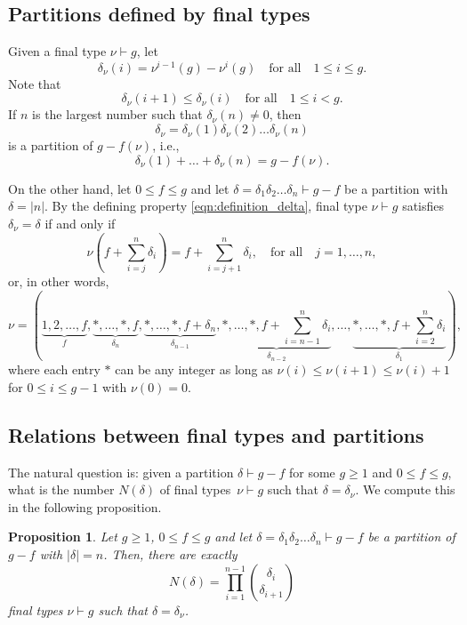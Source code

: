 \documentclass[11pt]{amsart}
\numberwithin{equation}{section}
\theoremstyle{plain}
\newcommand{\<}{\left \langle}
\renewcommand{\>}{\right \rangle}
\newtheorem{prop}[thm]{Proposition}
\theoremstyle{definition}
\theoremstyle{remark}
\begin{document}
\subsection{Partitions defined by final types}
\label{subsec:partitions_coming_from_final_types}
Given a final type $\nu \vdash g$, let 
\begin{equation}
\delta_{\nu}(i) = \nu^{i - 1}(g) - \nu^{i}(g)\quad \text{for all} \quad 1 \leq i \leq g.
\label{eqn:definition_delta}
\end{equation}
Note that $$\delta_{\nu}(i +1) \leq \delta_{\nu}(i)\quad \text{for all}\quad 1 \leq i < g.$$ If $n$ is the largest number such that $\delta_{\nu}(n) \neq 0$, then $$\delta_{\nu} = \delta_{\nu}(1)\delta_{\nu}(2) \ldots \delta_{\nu}(n)$$
is a partition of $g - f(\nu)$, i.e., $$\delta_{\nu}(1) + \ldots +  \delta_{\nu}(n) = g - f(\nu).$$ 

On the other hand, let $0 \leq f \leq g$ and let $\delta = \delta_1\delta_2 \ldots \delta_n \vdash g - f$ be  a partition with $\delta = |n|$. By the defining property \eqref{eqn:definition_delta}, final type $\nu \vdash g$ satisfies $\delta_{\nu} = \delta$ if and only if 
$$
\nu(f + \sum_{i = j}^n\delta_i) = f + \sum_{i = j + 1}^n\delta_i, \quad \text{for all} \quad j = 1, \ldots, n,
$$
or, in other words, 
\begin{equation}
  \nu =      (\underbrace{1, 2, \ldots, f}_{f}, \underbrace{*, \ldots, *, f}_{\delta_n}, \underbrace{*, \ldots, *, f + \delta_n}_{\delta_{n-1}}, \underbrace{*, \ldots, *, f + \sum_{i = n-1}^n\delta_i}_{\delta_{n-2}}, \ldots,  \underbrace{*, \ldots, *, f + \sum_{i = 2}^n \delta_i}_{\delta_1}),  
\label{eqn:nu_det_by_delta}
\end{equation}
where each entry $*$ can be any integer as long as $\nu(i) \leq \nu({i + 1}) \leq \nu(i) + 1$ for $0\leq i \leq g - 1$ with $\nu(0) = 0$. 

\subsection{Relations between final types and partitions}
The natural question is: given a partition $\delta \vdash g-f$ for some $g \geq 1$ and $0 \leq f \leq g$, what is the number $N(\delta)$ of final types~$\nu \vdash g$ such that $\delta = \delta_{\nu}$. We compute this in the following proposition. 

\begin{prop}
Let $g \geq 1$, $0 \leq f \leq g$ and let $\delta = \delta_1\delta_2\ldots\delta_n \vdash g - f$ be a partition of $g - f$ with $|\delta| = n$.  
Then, there are exactly $$N(\delta) = \prod_{i = 1}^{n-1}{\delta_i \choose \delta_{i + 1}}$$ final types $\nu \vdash g$ such that $\delta = \delta_{\nu}$. 
\label{prop_partitioF_finaltype_identity}
\end{prop}
\end{document}
